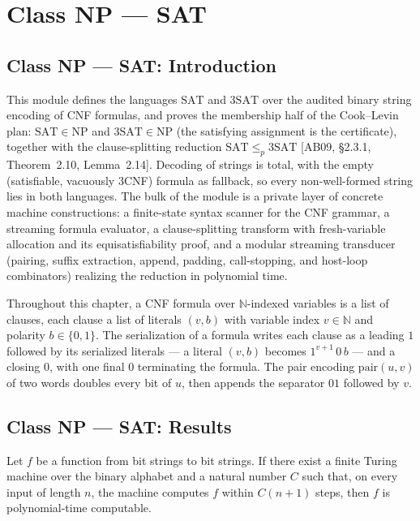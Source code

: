 \section{Class NP --- SAT}
\subsection*{Class NP --- SAT: Introduction}

This module defines the languages $\mathrm{SAT}$ and $\mathrm{3SAT}$ over the audited
binary string encoding of CNF formulas, and proves the membership half of the
Cook--Levin plan: $\mathrm{SAT} \in \mathrm{NP}$ and $\mathrm{3SAT} \in \mathrm{NP}$
(the satisfying assignment is the certificate), together with the clause-splitting
reduction $\mathrm{SAT} \le_p \mathrm{3SAT}$ [AB09, \S2.3.1, Theorem~2.10,
Lemma~2.14]. Decoding of strings is total, with the empty (satisfiable, vacuously
3CNF) formula as fallback, so every non-well-formed string lies in both languages.
The bulk of the module is a private layer of concrete machine constructions: a
finite-state syntax scanner for the CNF grammar, a streaming formula evaluator,
a clause-splitting transform with fresh-variable allocation and its equisatisfiability
proof, and a modular streaming transducer (pairing, suffix extraction, append,
padding, call-stopping, and host-loop combinators) realizing the reduction in
polynomial time.

Throughout this chapter, a CNF formula over $\mathbb{N}$-indexed variables is a
list of clauses, each clause a list of literals $(v,b)$ with variable index
$v \in \mathbb{N}$ and polarity $b \in \{0,1\}$. The serialization of a formula
writes each clause as a leading $1$ followed by its serialized literals — a literal
$(v,b)$ becomes $1^{v+1}\,0\,b$ — and a closing $0$, with one final $0$ terminating
the formula. The pair encoding $\mathrm{pair}(u,v)$ of two words doubles every bit
of $u$, then appends the separator $01$ followed by $v$.

\subsection*{Class NP --- SAT: Results}

\begin{lemma}
\label{Complexity.sat_pt_linear}
\leanok
{}
Let $f$ be a function from bit strings to bit strings. If there exist a finite Turing
machine over the binary alphabet and a natural number $C$ such that, on every input of
length $n$, the machine computes $f$ within $C(n+1)$ steps, then $f$ is polynomial-time
computable.
\end{lemma}

